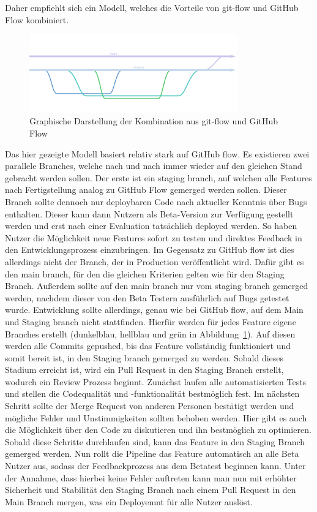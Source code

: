 Daher empfiehlt sich ein Modell, welches die Vorteile von git-flow und GitHub Flow kombiniert.
\begin{figure}[H]
    \includegraphics[width=0.8\textwidth]{img/branching}
    \centering
    \caption{Graphische Darstellung der Kombination aus git-flow und GitHub Flow}
    \label{fig:branchingModel}
\end{figure}

Das hier gezeigte Modell basiert relativ stark auf GitHub flow.
Es existieren zwei parallele Branches, welche nach und nach immer wieder auf den gleichen Stand gebracht werden sollen.
Der erste ist ein staging branch, auf welchen alle Features nach Fertigstellung analog zu GitHub Flow gemerged werden sollen.
Dieser Branch sollte dennoch nur deploybaren Code nach aktueller Kenntnis über Bugs enthalten.
Dieser kann dann Nutzern als Beta-Version zur Verfügung gestellt werden und erst nach einer Evaluation tatsächlich deployed werden.
So haben Nutzer die Möglichkeit neue Features sofort zu testen und direktes Feedback in den Entwicklungsprozess einzubringen.
Im Gegensatz zu GitHub flow ist dies allerdings nicht der Branch, der in Production veröffentlicht wird.
Dafür gibt es den main branch, für den die gleichen Kriterien gelten wie für den Staging Branch.
Außerdem sollte auf den main branch nur vom staging branch gemerged werden, nachdem dieser von den Beta Testern ausführlich auf Bugs getestet wurde.
Entwicklung sollte allerdings, genau wie bei GitHub flow, auf dem Main und Staging branch nicht stattfinden.
Hierfür werden für jedes Feature eigene Branches erstellt (dunkelblau, hellblau und grün in Abbildung~\ref{fig:branchingModel}).
Auf diesen werden alle Commits gepushed, bis das Feature vollständig funktioniert und somit bereit ist, in den Staging branch gemerged zu werden.
Sobald dieses Stadium erreicht ist, wird ein Pull Request in den Staging Branch erstellt, wodurch ein Review Prozess beginnt.
Zunächst laufen alle automatisierten Tests und stellen die Codequalität und -funktionalität bestmöglich fest.
Im nächsten Schritt sollte der Merge Request von anderen Personen bestätigt werden und mögliche Fehler und Unstimmigkeiten sollten behoben werden.
Hier gibt es auch die Möglichkeit über den Code zu diskutieren und ihn bestmöglich zu optimieren.
Sobald diese Schritte durchlaufen sind, kann das Feature in den Staging Branch gemerged werden.
Nun rollt die Pipeline das Feature automatisch an alle Beta Nutzer aus, sodass der Feedbackprozess aus dem Betatest beginnen kann.
Unter der Annahme, dass hierbei keine Fehler auftreten kann man nun mit erhöhter Sicherheit und Stabilität den Staging Branch nach einem Pull Request in den Main Branch mergen, was ein Deployemnt für alle Nutzer auslöst.

